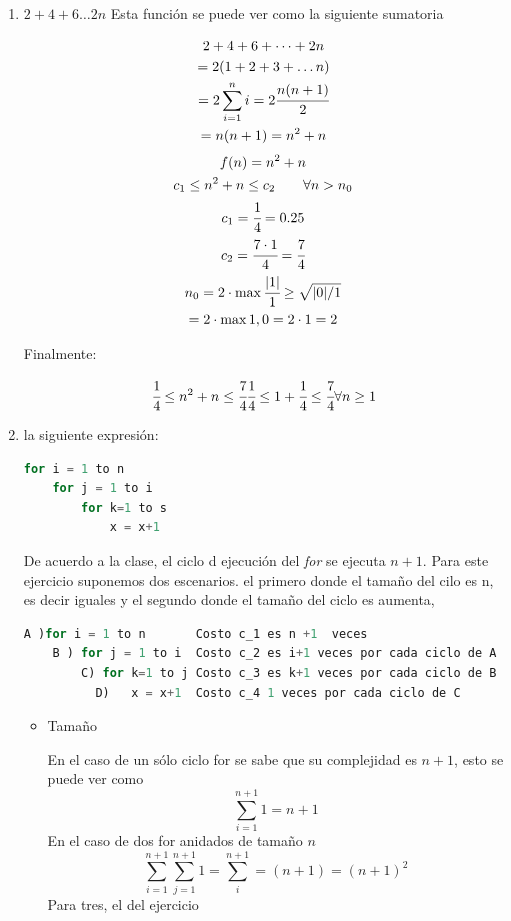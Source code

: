 \documentclass{article}
\begin{document}
\begin{enumerate}
    \item $2 + 4 + 6 \dots 2n$ Esta función se puede ver como la siguiente sumatoria
    
\begin{gather*} 
 2 +  4 +6 + \dots + 2n\\
 = 2 ( 1 + 2 + 3 + \dots n)\\
 = 2 \sum_{i=1}^{n}i = 2\cfrac{n(n+1)}{2}\\
 = n(n+1) = n^2 + n \\
 \end{gather*}
 \begin{gather*} 
 f(n)=n^2 + n  \\ 
 c_1 \leq n^2 + n  \leq c_2 \quad \quad  \forall n>n_0\\
 c_1 = \cfrac{1}{4} = 0.25\\
 c_2= \cfrac{7\cdot 1}{4}=\cfrac{7}{4}\\
 n_0 = 2\cdot\max{\cfrac{|1|}{1}\geq \sqrt{|0|/1 }}\\
 = 2\cdot\max{1, 0}
 = 2\cdot 1 = 2
\end{gather*}

Finalmente:

\begin{gather*} 
    \cfrac{1}{4} \leq n^2 + n \leq \cfrac{7}{4}
    \cfrac{1}{4} \leq 1 + \cfrac{1}{4} \leq \cfrac{7}{4}
 \forall n \geq 1
 \end{gather*}
    \item la siguiente expresión:
\begin{lstlisting}[language=Python]
for i = 1 to n  
    for j = 1 to i
        for k=1 to s
            x = x+1
\end{lstlisting}
De acuerdo a la clase, el ciclo d ejecución del \textit{for} se ejecuta $n+1$. Para este ejercicio suponemos dos escenarios. el primero donde el tamaño del cilo es n, es decir iguales y el segundo donde el tamaño del ciclo es aumenta, 
\begin{lstlisting}[language=Python]
A )for i = 1 to n       Costo c_1 es n +1  veces
    B ) for j = 1 to i  Costo c_2 es i+1 veces por cada ciclo de A
        C) for k=1 to j Costo c_3 es k+1 veces por cada ciclo de B
          D)   x = x+1  Costo c_4 1 veces por cada ciclo de C
\end{lstlisting}
\begin{itemize}
\item  Tamaño

En el caso de un sólo ciclo for  se sabe que su complejidad es $n+1$, esto se puede ver como
\begin{equation*}
    \sum_{i=1}^{n+1} 1 = n+1
\end{equation*}
En el caso de dos for anidados de tamaño $n$
\begin{equation*}
    \sum_{i=1}^{n+1}\sum_{j=1}^{n+1} 1 = \sum_i^{n+1}= (n+1) = (n+1)^2
\end{equation*}
Para tres, el del ejercicio


\end{itemize}
\end{enumerate}
\end{document}

